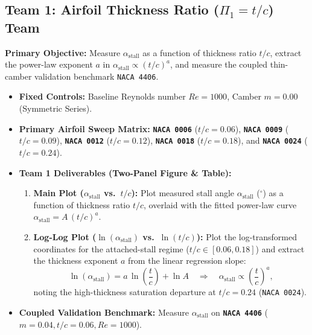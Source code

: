 \documentclass[11pt,a4paper]{article}
\begin{document}
\subsection{Team 1: Airfoil Thickness Ratio (\texorpdfstring{$\Pi_1 = t/c$}{Pi1 = t/c}) Team}
\textbf{Primary Objective:} Measure $\alpha_{\text{stall}}$ as a function of thickness ratio $t/c$, extract the power-law exponent $a$ in $\alpha_{\text{stall}} \propto (t/c)^a$, and measure the coupled thin-camber validation benchmark \texttt{NACA 4406}.
\begin{itemize}[itemsep=2pt]
    \item \textbf{Fixed Controls:} Baseline Reynolds number $Re = 1000$, Camber $m = 0.00$ (Symmetric Series).
    \item \textbf{Primary Airfoil Sweep Matrix:} \textbf{\texttt{NACA 0006}} ($t/c = 0.06$), \textbf{\texttt{NACA 0009}} ($t/c = 0.09$), \textbf{\texttt{NACA 0012}} ($t/c = 0.12$), \textbf{\texttt{NACA 0018}} ($t/c = 0.18$), and \textbf{\texttt{NACA 0024}} ($t/c = 0.24$).
    \item \textbf{Team 1 Deliverables (Two-Panel Figure \& Table):}
    \begin{enumerate}
        \item \textbf{Main Plot ($\alpha_{\text{stall}}$ vs.\ $t/c$):} Plot measured stall angle $\alpha_{\text{stall}}$ ($^\circ$) as a function of thickness ratio $t/c$, overlaid with the fitted power-law curve $\alpha_{\text{stall}} = A\,(t/c)^a$.
        \item \textbf{Log-Log Plot ($\ln(\alpha_{\text{stall}})$ vs.\ $\ln(t/c)$):} Plot the log-transformed coordinates for the attached-stall regime ($t/c \in [0.06, 0.18]$) and extract the thickness exponent $a$ from the linear regression slope:
        \begin{equation}
        \ln(\alpha_{\text{stall}}) = a\,\ln\!\left(\frac{t}{c}\right) + \ln A \quad \Longrightarrow \quad \alpha_{\text{stall}} \propto \left(\frac{t}{c}\right)^a,
        \end{equation}
        noting the high-thickness saturation departure at $t/c = 0.24$ (\texttt{NACA 0024}).
    \end{enumerate}
    \item \textbf{Coupled Validation Benchmark:} Measure $\alpha_{\text{stall}}$ on \textbf{\texttt{NACA 4406}} ($m=0.04, t/c=0.06, Re=1000$).
\end{itemize}
\end{document}
